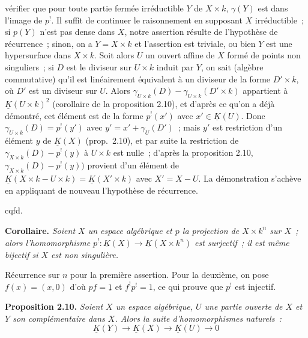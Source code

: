 vérifier que pour toute partie fermée irréductible $Y$ de $X\times k$, $\gamma(Y)$ est dans l'image de $p^!$. Il suffit de continuer le raisonnement en supposant $X$ irréductible~; si $p(Y)$ n'est pas dense dans $X$, notre assertion résulte de l'hypothèse de récurrence~; sinon, on a $Y=X\times k$ et l'assertion est triviale, ou bien $Y$ est une hypersurface dans $X\times k$. Soit alors $U$ un ouvert affine de $X$ formé de points non singuliers~; si $D$ est le diviseur sur $U\times k$ induit par $Y$, on sait (algèbre commutative) qu'il est linéairement équivalent à un diviseur de la forme $D'\times k$, où $D'$ est un diviseur sur $U$. Alors $\gamma_{U\times k}(D)-\gamma_{U\times k}(D'\times k)$ appartient à $\underline K(U\times k)^2$ (corollaire de la proposition 2.10), et d'après ce qu'on a déjà démontré, cet élément est de la forme $p^!(x')$ avec $x'\in\underline K(U)$. Donc $\gamma_{U\times k}(D)=p^!(y')$ avec $y'=x'+\gamma_U(D')$~; mais $y'$ est restriction d'un élément $y$ de $\underline K(X)$ (prop.\ 2.10), et par suite la restriction de $\gamma_{X\times k}(D)-p^!(y)$ à $U\times k$ est nulle~; d'après la proposition 2.10, $\gamma_{X\times k}(D)-p^!(y))$ provient d'un élément de $\underline K(X\times k-U\times k)=\underline K(X'\times k)$ avec $X'=X-U$. La démonstration s'achève en appliquant de nouveau l'hypothèse de récurrence.
\begin{flushright}cqfd.\end{flushright}

\textbf{Corollaire.} \emph{Soient $X$ un espace algébrique et $p$ la projection de $X\times k^n$ sur $X$~; alors l'homomorphisme $p^!:\underline K(X)\longrightarrow\underline K(X\times k^n)$ est surjectif~; il est même bijectif si $X$ est non singulière.}

Récurrence sur $n$ pour la première assertion. Pour la deuxième, on pose $f(x)=(x,0)$ d'où $pf=\underline{1}$ et $f^!p^!=1$, ce qui prouve que $p^!$ est injectif.

\textbf{Proposition 2.10.} \emph{Soient $X$ un espace algébrique, $U$ une partie ouverte de $X$ et $Y$ son complémentaire dans $X$. Alors la suite d'homomorphismes naturels~:}
\begin{equation}\tag{2.30}
 \underline K(Y)\longrightarrow\underline K(X)\longrightarrow\underline K(U)\longrightarrow 0
\end{equation}
